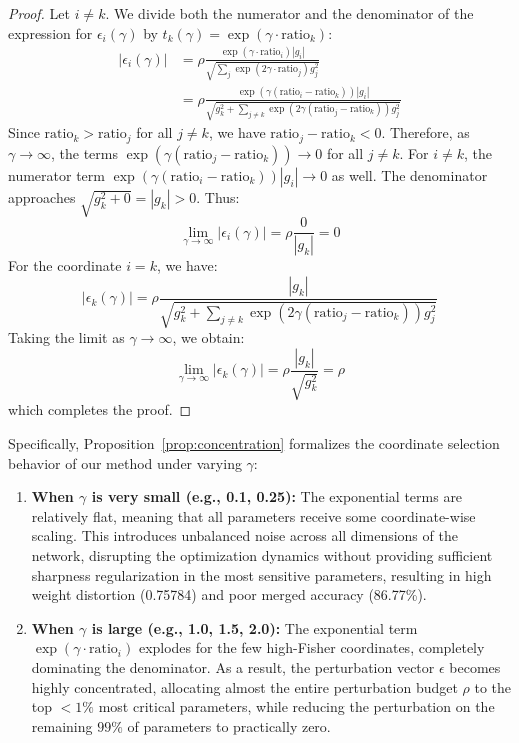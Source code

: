 \documentclass{article}
\theoremstyle{plain}
\theoremstyle{definition}
\theoremstyle{remark}
\begin{document}
\begin{proof}
Let $i \neq k$. We divide both the numerator and the denominator of the expression for $\epsilon_i(\gamma)$ by $t_k(\gamma) = \exp(\gamma \cdot \text{ratio}_k)$:
\begin{align*}
    |\epsilon_i(\gamma)| &= \rho \frac{\exp(\gamma \cdot \text{ratio}_i) |g_i|}{\sqrt{\sum_j \exp(2\gamma \cdot \text{ratio}_j) g_j^2}} \\
    &= \rho \frac{\exp(\gamma(\text{ratio}_i - \text{ratio}_k)) |g_i|}{\sqrt{g_k^2 + \sum_{j \neq k} \exp(2\gamma(\text{ratio}_j - \text{ratio}_k)) g_j^2}}
\end{align*}
Since $\text{ratio}_k > \text{ratio}_j$ for all $j \neq k$, we have $\text{ratio}_j - \text{ratio}_k < 0$. Therefore, as $\gamma \to \infty$, the terms $\exp(\gamma(\text{ratio}_j - \text{ratio}_k)) \to 0$ for all $j \neq k$. 
For $i \neq k$, the numerator term $\exp(\gamma(\text{ratio}_i - \text{ratio}_k)) |g_i| \to 0$ as well. The denominator approaches $\sqrt{g_k^2 + 0} = |g_k| > 0$. Thus:
\begin{equation*}
    \lim_{\gamma \to \infty} |\epsilon_i(\gamma)| = \rho \frac{0}{|g_k|} = 0
\end{equation*}
For the coordinate $i = k$, we have:
\begin{equation*}
    |\epsilon_k(\gamma)| = \rho \frac{|g_k|}{\sqrt{g_k^2 + \sum_{j \neq k} \exp(2\gamma(\text{ratio}_j - \text{ratio}_k)) g_j^2}}
\end{equation*}
Taking the limit as $\gamma \to \infty$, we obtain:
\begin{equation*}
    \lim_{\gamma \to \infty} |\epsilon_k(\gamma)| = \rho \frac{|g_k|}{\sqrt{g_k^2}} = \rho
\end{equation*}
which completes the proof.
\end{proof}

Specifically, Proposition~\ref{prop:concentration} formalizes the coordinate selection behavior of our method under varying $\gamma$:
\begin{enumerate}\setlength{\itemsep}{0pt}\setlength{\parskip}{0pt}\setlength{\parsep}{0pt}
    \item \textbf{When $\gamma$ is very small (e.g., 0.1, 0.25):} The exponential terms are relatively flat, meaning that all parameters receive some coordinate-wise scaling. This introduces unbalanced noise across all dimensions of the network, disrupting the optimization dynamics without providing sufficient sharpness regularization in the most sensitive parameters, resulting in high weight distortion (0.75784) and poor merged accuracy (86.77\%).
    \item \textbf{When $\gamma$ is large (e.g., 1.0, 1.5, 2.0):} The exponential term $\exp(\gamma \cdot \text{ratio}_i)$ explodes for the few high-Fisher coordinates, completely dominating the denominator. As a result, the perturbation vector $\epsilon$ becomes highly concentrated, allocating almost the entire perturbation budget $\rho$ to the top $<1\%$ most critical parameters, while reducing the perturbation on the remaining $99\%$ of parameters to practically zero.
\end{enumerate}
\end{document}
